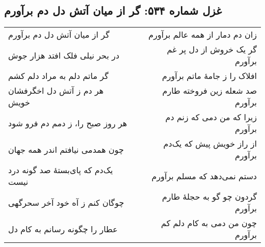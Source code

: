 \begin{center}
\section*{غزل شماره ۵۳۴: گر از میان آتش دل دم برآورم}
\label{sec:534}
\begin{longtable}{l p{0.5cm} r}
گر از میان آتش دل دم برآورم
&&
زان دم دمار از همه عالم برآورم
\\
در بحر نیلی فلک افتد هزار جوش
&&
گر یک خروش از دل پر غم برآورم
\\
گر ماتم دلم به مراد دلم کشم
&&
افلاک را ز جامهٔ ماتم برآورم
\\
هر دم ز آتش دل اخگرفشان خویش
&&
صد شعله زین فروخته طارم برآورم
\\
هر روز صبح را، ز دمم دم فرو شود
&&
زیرا که من دمی که زنم دم برآورم
\\
چون همدمی نیافتم اندر همه جهان
&&
از راز خویش پیش که یک‌دم برآورم
\\
یک‌دم که پای‌بستهٔ صد گونه درد نیست
&&
دستم نمی‌دهد که مسلم برآورم
\\
چوگان کنم ز آه خود آخر سحرگهی
&&
گردون چو گو به حجلهٔ طارم برآورم
\\
عطار را چگونه رسانم به کام دل
&&
چون من دمی به کام دلم کم برآورم
\\
\end{longtable}
\end{center}
